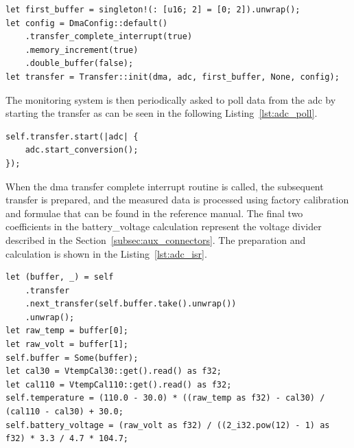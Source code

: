 \begin{lstlisting}[caption={Configuration of the DMA controller for ADC transfers.},label=lst:dma]
let first_buffer = singleton!(: [u16; 2] = [0; 2]).unwrap();
let config = DmaConfig::default()
    .transfer_complete_interrupt(true)
    .memory_increment(true)
    .double_buffer(false);
let transfer = Transfer::init(dma, adc, first_buffer, None, config);
\end{lstlisting}

The monitoring system is then periodically asked to poll data from the \acs{adc} by starting the transfer as can be seen in the following Listing~\ref{lst:adc_poll}.
\begin{lstlisting}[caption={Polling the ADC.},label=lst:adc_poll]
self.transfer.start(|adc| {
    adc.start_conversion();
});
\end{lstlisting}
When the \acs{dma} transfer complete interrupt routine is called, the subsequent transfer is prepared, and the measured data is processed using factory calibration and formulae that can be found in the reference manual\cite{stmicro_stm32f405xx_2020}.
The final two coefficients in the battery\_voltage calculation represent the voltage divider described in the Section~\ref{subsec:aux_connectors}.
The preparation and calculation is shown in the Listing~\ref{lst:adc_isr}.

\newpage
\begin{lstlisting}[caption={Processing the data measured by the ADC.},label=lst:adc_isr]
let (buffer, _) = self
    .transfer
    .next_transfer(self.buffer.take().unwrap())
    .unwrap();
let raw_temp = buffer[0];
let raw_volt = buffer[1];
self.buffer = Some(buffer);
let cal30 = VtempCal30::get().read() as f32;
let cal110 = VtempCal110::get().read() as f32;
self.temperature = (110.0 - 30.0) * ((raw_temp as f32) - cal30) / (cal110 - cal30) + 30.0;
self.battery_voltage = (raw_volt as f32) / ((2_i32.pow(12) - 1) as f32) * 3.3 / 4.7 * 104.7;
\end{lstlisting}

\newpage

